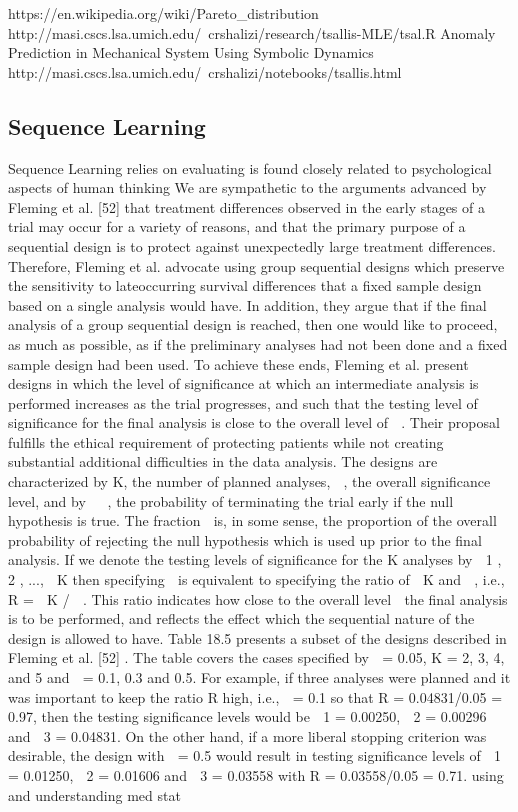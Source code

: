 \documentclass[12pt]{article}
\begin{document}
https://en.wikipedia.org/wiki/Pareto_distribution
http://masi.cscs.lsa.umich.edu/~crshalizi/research/tsallis-MLE/tsal.R
Anomaly Prediction in Mechanical System Using Symbolic Dynamics
http://masi.cscs.lsa.umich.edu/~crshalizi/notebooks/tsallis.html



\subsection{Sequence Learning}
Sequence Learning relies on evaluating is found closely related to psychological aspects of human thinking
We are sympathetic to the arguments advanced by Fleming et al. [52] that
treatment differences observed in the early stages of a trial may occur for a variety
of reasons, and that the primary purpose of a sequential design is to protect
against unexpectedly large treatment differences. Therefore, Fleming et al.
advocate using group sequential designs which preserve the sensitivity to lateoccurring
survival differences that a fixed sample design based on a single
analysis would have. In addition, they argue that if the final analysis of a group
sequential design is reached, then one would like to proceed, as much as possible,
as if the preliminary analyses had not been done and a fixed sample design
had been used.
To achieve these ends, Fleming et al. present designs in which the level of
significance at which an intermediate analysis is performed increases as the
trial progresses, and such that the testing level of significance for the final analysis
is close to the overall level of  . Their proposal fulfills the ethical requirement
of protecting patients while not creating substantial additional difficulties
in the data analysis. The designs are characterized by K, the number of planned
analyses,  , the overall significance level, and by   , the probability of terminating
the trial early if the null hypothesis is true. The fraction  is, in some
sense, the proportion of the overall probability of rejecting the null hypothesis
which is used up prior to the final analysis. If we denote the testing levels of
significance for the K analyses by  1 ,  2 , ...,  K then specifying  is equivalent
to specifying the ratio of  K and  , i.e., R =  K /  . This ratio indicates how close
to the overall level  the final analysis is to be performed, and reflects the effect
which the sequential nature of the design is allowed to have.
Table 18.5 presents a subset of the designs described in Fleming et al. [52] .
The table covers the cases specified by  = 0.05, K = 2, 3, 4, and 5 and  = 0.1,
0.3 and 0.5. For example, if three analyses were planned and it was important
to keep the ratio R high, i.e.,  = 0.1 so that R = 0.04831/0.05 = 0.97, then the
testing significance levels would be  1 = 0.00250,  2 = 0.00296 and  3 = 0.04831.
On the other hand, if a more liberal stopping criterion was desirable, the design
with  = 0.5 would result in testing significance levels of  1 = 0.01250,  2 =
0.01606 and  3 = 0.03558 with R = 0.03558/0.05 = 0.71.
using and understanding med stat
\end{document}
